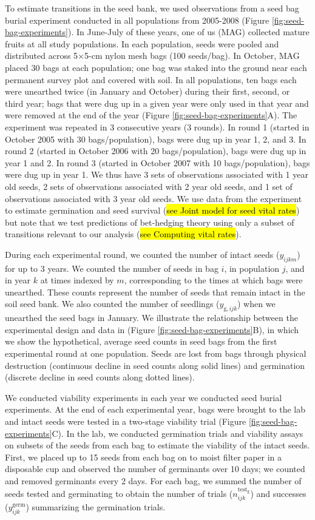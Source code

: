 \documentclass[12pt, oneside, titlepage]{article}   	%
\begin{document}
{To estimate transitions in the seed bank, we used observations from a seed bag burial experiment conducted in all populations from 2005-2008 (Figure \ref{fig:seed-bag-experiments}). In June-July of these years, one of us (MAG) collected mature fruits at all study populations. In each population, seeds were pooled and distributed across 5$\times$5-cm nylon mesh bags (100 seeds/bag). In October, MAG placed 30 bags at each population; one bag was staked into the ground near each permanent survey plot and covered with soil. In all populations, ten bags each were unearthed twice (in January and October) during their first, second, or third year; bags that were dug up in a given year were only used in that year and were removed at the end of the year (Figure \ref{fig:seed-bag-experiments}A). The experiment was repeated in 3 consecutive years (3 rounds). In round 1 (started in October 2005 with 30 bags/population), bags were dug up in year 1, 2, and 3. In round 2 (started in October 2006 with 20 bags/population), bags were dug up in year 1 and 2. In round 3 (started in October 2007 with 10 bags/population), bags were dug up in year 1. We thus have 3 sets of observations associated with 1 year old seeds, 2 sets of observations associated with 2 year old seeds, and 1 set of observations associated with 3 year old seeds. We use data from the experiment to estimate germination and seed survival (\hl{see Joint model for seed vital rates}) but note that we test predictions of bet-hedging theory using only a subset of transitions relevant to our analysis (\hl{see Computing vital rates}).

During each experimental round, we counted the number of intact seeds ($y_{ijkm}$) for up to 3 years. We counted the number of seeds in bag $i$, in population $j$, and in year $k$ at times indexed by $m$, corresponding to the times at which bags were unearthed. These counts represent the number of seeds that remain intact in the soil seed bank. We also counted the number of seedlings ($y_{\mathrm{g},ijk}$) when we unearthed the seed bags in January. We illustrate the relationship between the experimental design and data in (Figure \ref{fig:seed-bag-experiments}B), in which we show the hypothetical, average seed counts in seed bags from the first experimental round at one population. Seeds are lost from bags through physical destruction (continuous decline in seed counts along solid lines) and germination (discrete decline in seed counts along dotted lines). 

We conducted viability experiments in each year we conducted seed burial experiments. At the end of each experimental year, bags were brought to the lab and intact seeds were tested in a two-stage viability trial (Figure \ref{fig:seed-bag-experiments}C). In the lab, we conducted germination trials and viability assays on subsets of the seeds from each bag to estimate the viability of the intact seeds. First, we placed up to 15 seeds from each bag on to moist filter paper in a disposable cup and observed the number of germinants over 10 days; we counted and removed germinants every 2 days. For each bag, we summed the number of seeds tested and germinating to obtain the number of trials ($n^\mathrm{test_g}_{ijk}$) and successes ($y^{\mathrm{germ}}_{ijk}$) summarizing the germination trials. 

}
\end{document}
